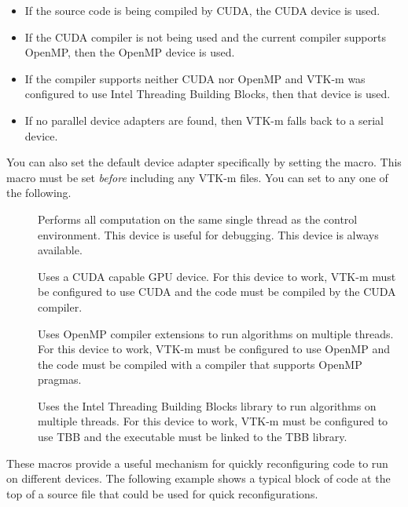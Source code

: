 \begin{itemize}
\item {} If the source code is being compiled by CUDA, the CUDA
  device is used.
\item {} If the CUDA compiler is not being used and the current
  compiler supports OpenMP, then the OpenMP device is used.
\item {}  If the compiler
  supports neither CUDA nor OpenMP and VTK-m was configured to use Intel
  Threading Building Blocks, then that device is used.
\item {} If no parallel device adapters are found, then VTK-m
  falls back to a serial device.
\end{itemize}

You can also set the default device adapter specifically by setting the
 macro. This macro must be set
\emph{before} including any VTK-m files. You can set
 to any one of the following.

\begin{description}
\item[] Performs all computation on
  the same single thread as the control environment. This device is useful
  for debugging. This device is always available.
\item[] Uses a CUDA capable GPU
  device. For this device to work, VTK-m must be configured to use CUDA and
  the code must be compiled by the CUDA  compiler.
\item[] Uses OpenMP compiler
  extensions to run algorithms on multiple threads. For this device to
  work, VTK-m must be configured to use OpenMP and the code must be
  compiled with a compiler that supports OpenMP pragmas. 
\item[] Uses the Intel Threading
  Building Blocks library to run algorithms on multiple threads. For this
  device to work, VTK-m must be configured to use TBB and the executable
  must be linked to the TBB library.
\end{description}

These macros provide a useful mechanism for quickly reconfiguring code to
run on different devices. The following example shows a typical block of
code at the top of a source file that could be used for quick
reconfigurations.

